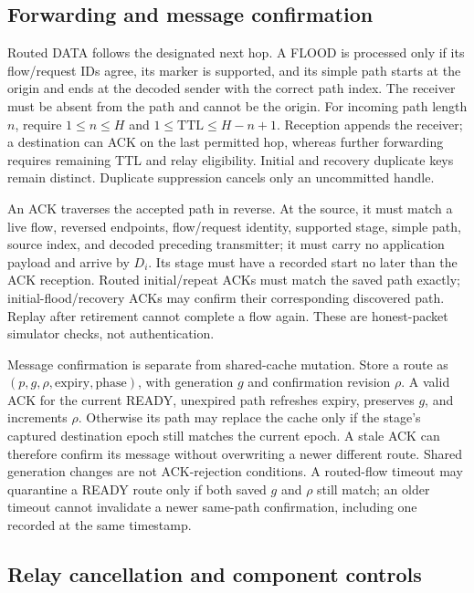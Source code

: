 \subsection{Forwarding and message confirmation}

Routed DATA follows the designated next hop. A FLOOD is processed only if
its flow/request IDs agree, its marker is supported, and its simple path
starts at the origin and ends at the decoded sender with the correct path
index. The receiver must be absent from the path and cannot be the origin.
For incoming path length $n$, require $1\le n\le H$ and
$1\le\mathrm{TTL}\le H-n+1$. Reception appends the receiver; a destination
can ACK on the last permitted hop, whereas further forwarding requires
remaining TTL and relay eligibility. Initial and recovery duplicate keys
remain distinct. Duplicate suppression cancels only an uncommitted handle.

An ACK traverses the accepted path in reverse. At the source, it must match
a live flow, reversed endpoints, flow/request identity, supported stage,
simple path, source index, and decoded preceding transmitter; it must carry
no application payload and arrive by $D_i$. Its stage must have a recorded
start no later than the ACK reception. Routed initial/repeat ACKs must
match the saved path exactly; initial-flood/recovery ACKs may confirm their
corresponding discovered path. Replay after retirement cannot complete a
flow again. These are honest-packet simulator checks, not authentication.

Message confirmation is separate from shared-cache mutation. Store a route
as $(p,g,\rho,\mathrm{expiry},\mathrm{phase})$, with generation $g$ and
confirmation revision $\rho$. A valid ACK for the current READY, unexpired
path refreshes expiry, preserves $g$, and increments $\rho$. Otherwise its
path may replace the cache only if the stage's captured destination epoch
still matches the current epoch. A stale ACK can therefore confirm its
message without overwriting a newer different route. Shared generation
changes are not ACK-rejection conditions. A routed-flow timeout may
quarantine a READY route only if both saved $g$ and $\rho$ still match;
an older timeout cannot invalidate a newer same-path confirmation, including
one recorded at the same timestamp.

\subsection{Relay cancellation and component controls}

